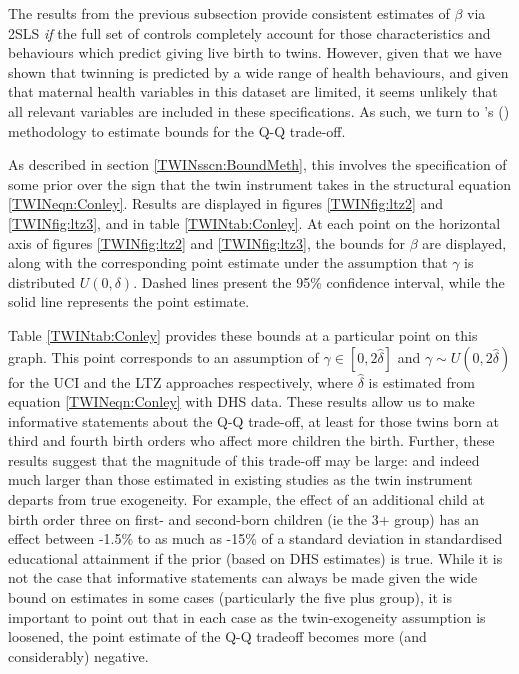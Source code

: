 The results from the previous subsection provide consistent estimates of $\beta$
via 2SLS \emph{if} the full set of controls completely account for those 
characteristics and behaviours which predict giving live birth to twins.  
However, given that we have shown that twinning is predicted by a wide range
of health behaviours, and given that maternal health variables in this dataset
are limited, it seems unlikely that all relevant variables are included in
these specifications.  As such, we turn to \citeauthor{Conleyetal2012}'s
(\citeyear{Conleyetal2012}) methodology to estimate bounds for the Q-Q trade-off.

As described in section \ref{TWINsscn:BoundMeth}, this involves the specification
of some prior over the sign that the twin instrument takes in the structural
equation \ref{TWINeqn:Conley}.  Results are displayed in figures 
\ref{TWINfig:ltz2} and \ref{TWINfig:ltz3}, and in table \ref{TWINtab:Conley}.
At each point on the horizontal axis of figures \ref{TWINfig:ltz2} and 
\ref{TWINfig:ltz3}, the bounds for $\beta$ are displayed, along with the
corresponding point estimate under the assumption that $\gamma$ is distributed
$U(0,\delta)$.  Dashed lines present the 95\% confidence interval, while the
solid line represents the point estimate.

Table \ref{TWINtab:Conley} provides these bounds at a particular point on this
graph.  This point corresponds to an assumption of $\gamma \in [0,2\hat\delta]$
and $\gamma\sim U(0,2\hat\delta)$ for the UCI and the LTZ approaches respectively,
where $\hat\delta$ is estimated from equation \ref{TWINeqn:Conley} with DHS data.
These results allow us to make informative statements about the Q-Q trade-off,
at least for those twins born at third and fourth birth orders who affect more
children the birth.  Further, these results suggest that the magnitude of this
trade-off may be large: and indeed much larger than those estimated in existing 
studies as the twin instrument departs from true exogeneity.  For example, the
effect of an additional child at birth order three on first- and second-born
children (ie the 3+ group) has an effect between -1.5\% to as much as -15\% of
a standard deviation in standardised educational attainment if the prior 
(based on DHS estimates) is true.  While it is not the case that informative
statements can always be made given the wide bound on estimates in some cases
(particularly the five plus group), it is important to point out that in each
case as the twin-exogeneity assumption is loosened, the point estimate of the
Q-Q tradeoff becomes more (and considerably) negative.
